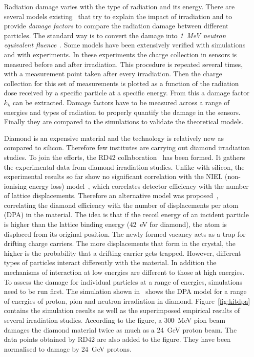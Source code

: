 Radiation damage varies with the type of radiation and its energy. There are several models existing~\cite{2002NIMPA,Guthoff:2014223} that try to explain the impact of irradiation and to provide \emph{damage factors} to compare the radiation damage between different particles. The standard way is to convert the damage into \emph{1~MeV neutron equivalent fluence}~\cite{NEQ:00000}. Some models have been extensively verified with simulations and with experiments. In these experiments the charge collection in sensors is measured before and after irradiation. This procedure is repeated several times, with a measurement point taken after every irradiation. Then the charge collection for this set of measurements is plotted as a function of the radiation dose received by a specific particle at a specific energy. From this a damage factor $k_\mathrm{\lambda}$ can be extracted. Damage factors have to be measured across a range of energies and types of radiation to properly quantify the damage in the sensors. Finally they are compared to the simulations to validate the theoretical models.

Diamond is an expensive material and the technology is relatively new as compared to silicon. Therefore few institutes are carrying out diamond irradiation studies. To join the efforts, the RD42 collaboration~\cite{RD42:00000} has been formed. It gathers the experimental data from diamond irradiation studies. Unlike with silicon, the experimental results so far show no significant correlation with the NIEL (non-ionising energy loss) model~\cite{2002NIMPA}, which correlates detector efficiency with the number of lattice displacements. Therefore an alternative model was proposed~\cite{Guthoff:2014223}, correlating the diamond efficiency with the number of displacements per atom (DPA) in the material. The idea is that if the recoil energy of an incident particle is higher than the lattice binding energy (42~eV for diamond), the atom is displaced from its original position. The newly formed vacancy acts as a trap for drifting charge carriers. The more displacements that form in the crystal, the higher is the probability that a drifting carrier gets trapped. However, different types of particles interact differently with the material. In addition the mechanisms of interaction at low energies are different to those at high energies. To assess the damage for individual particles at a range of energies, simulations need to be run first. The simulation shown in~\cite{Guthoff:2014223} shows the DPA model for a range of energies of proton, pion and neutron irradiation in diamond. Figure~\ref{fig:kitdpa}  contains the simulation results as well as the superimposed empirical results of several irradiation studies. According to the figure, a 300~MeV pion beam damages the diamond material twice as much as a 24~GeV proton beam. The data points obtained by RD42 are also added to the figure. They have been normalised to damage by 24~GeV protons. 

